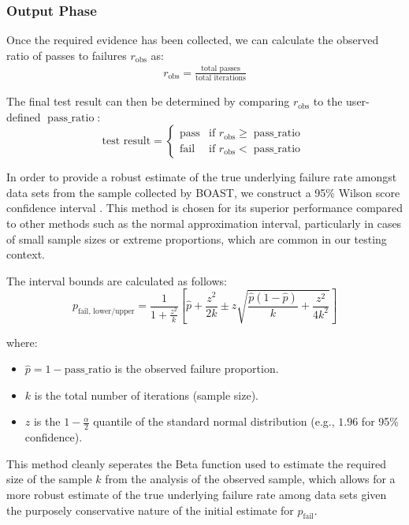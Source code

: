 \subsubsection{Output Phase}

Once the required evidence has been collected, we can calculate the observed ratio of passes to failures $r_\text{obs}$ as:
\begin{align}
    r_\text{obs} = \frac{\text{total passes}}{\text{total iterations}}
\end{align}

The final test result can then be determined by comparing $r_\text{obs}$ to the user-defined $\operatorname{pass\_ratio}$:
\[
    \text{test result} =
    \begin{cases}
    \text{pass} & \text{if } r_\text{obs} \ge \operatorname{pass\_ratio} \\
    \text{fail} & \text{if } r_\text{obs} < \operatorname{pass\_ratio}
    \end{cases}
\]

In order to provide a robust estimate of the true underlying failure rate amongst data sets from the sample collected by BOAST, we construct a 95\% Wilson score confidence interval \cite{wilson1927}. This method is chosen for its superior performance compared to other methods such as the normal approximation interval, particularly in cases of small sample sizes or extreme proportions, which are common in our testing context.

The interval bounds are calculated as follows:
\begin{equation}
p_{\text{fail, lower/upper}} = \frac{1}{1 + \frac{z^2}{k}} \left[ \hat{p} + \frac{z^2}{2k} \pm z \sqrt{\frac{\hat{p}(1-\hat{p})}{k} + \frac{z^2}{4k^2}} \right]
\end{equation}

where:
\begin{itemize}
    \item $\hat{p} = 1 - \text{pass\_ratio}$ is the observed failure proportion.
    \item $k$ is the total number of iterations (sample size).
    \item $z$ is the $1 - \frac{\alpha}{2}$ quantile of the standard normal distribution (e.g., $1.96$ for 95\% confidence).
\end{itemize}

This method cleanly seperates the Beta function used to estimate the required size of the sample $k$ from the analysis of the observed sample, which allows for a more robust estimate of the true underlying failure rate among data sets given the purposely conservative nature of the initial estimate for $p_{\text{fail}}$.

